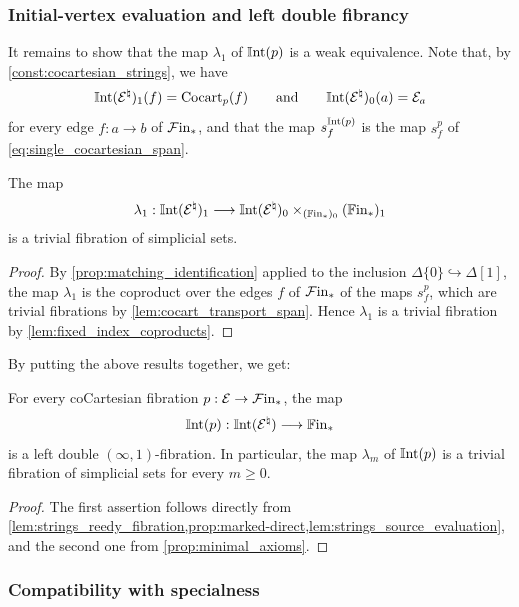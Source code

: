 \documentclass[10pt,reqno]{amsart}
\begin{document}
\subsubsection{Initial-vertex evaluation and left double fibrancy}

\label{subsubsec:initial_vertex_condition}

It remains to show that the map $\lambda_1$ of $\mathbb{I}\mathrm{nt}(p)$ is a weak
equivalence. Note that, by \cref{const:cocartesian_strings}, we have
\[
\mathbb{I}\mathrm{nt}(\mathcal E^\natural)_1(f)=\operatorname{Cocart}_p(f)
\qquad\text{and}\qquad
\mathbb{I}\mathrm{nt}(\mathcal E^\natural)_0(a)=\mathcal E_a
\]
for every edge $f:a\to b$ of $\mathcal{F}\mathrm{in}_*$, and that the map
$s_f^{\mathbb{I}\mathrm{nt}(p)}$ is the map $s_f^p$ of
\eqref{eq:single_cocartesian_span}.

\begin{lemma}
\label{lem:strings_source_evaluation}
The map
\[
\lambda_1:\mathbb{I}\mathrm{nt}(\mathcal E^\natural)_1\longrightarrow
\mathbb{I}\mathrm{nt}(\mathcal E^\natural)_0\times_{(\mathbb{F}\mathrm{in}_*)_0}(\mathbb{F}\mathrm{in}_*)_1
\]
is a trivial fibration of simplicial sets.
\end{lemma}

\begin{proof}
By \cref{prop:matching_identification} applied to the inclusion
$\Delta\{0\}\hookrightarrow\Delta[1]$, the map $\lambda_1$ is the
coproduct over the edges $f$ of $\mathcal{F}\mathrm{in}_*$ of the maps $s_f^p$,
which are trivial fibrations by \cref{lem:cocart_transport_span}.
Hence $\lambda_1$ is a trivial fibration by
\cref{lem:fixed_index_coproducts}.
\end{proof}

By putting the above results together, we get:

\begin{corollary}
\label{cor:left-double}
For every coCartesian fibration $p:\mathcal E\to \mathcal{F}\mathrm{in}_*$, the map
\[
\mathbb{I}\mathrm{nt}(p):\mathbb{I}\mathrm{nt}(\mathcal E^\natural)\longrightarrow\mathbb{F}\mathrm{in}_*
\]
is a left double $(\infty,1)$-fibration. In particular, the map
$\lambda_m$ of $\mathbb{I}\mathrm{nt}(p)$ is a trivial fibration of simplicial sets
for every $m\geq0$.
\end{corollary}

\begin{proof}
The first assertion follows directly from
\cref{lem:strings_reedy_fibration,prop:marked-direct,lem:strings_source_evaluation},
and the second one from \cref{prop:minimal_axioms}.
\end{proof}

\subsubsection{Compatibility with specialness}
\end{document}
